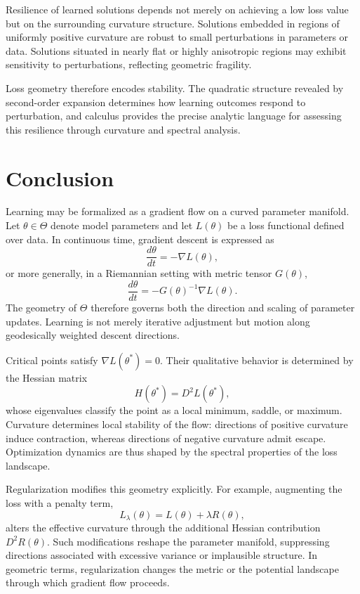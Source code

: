 \documentclass[12pt]{book}
\begin{document}
Resilience of learned solutions depends not merely on achieving a low loss value but on the surrounding curvature structure. Solutions embedded in regions of uniformly positive curvature are robust to small perturbations in parameters or data. Solutions situated in nearly flat or highly anisotropic regions may exhibit sensitivity to perturbations, reflecting geometric fragility.

Loss geometry therefore encodes stability. The quadratic structure revealed by second-order expansion determines how learning outcomes respond to perturbation, and calculus provides the precise analytic language for assessing this resilience through curvature and spectral analysis.

\section{Conclusion}

Learning may be formalized as a gradient flow on a curved parameter manifold. Let $\theta \in \Theta$ denote model parameters and let $L(\theta)$ be a loss functional defined over data. In continuous time, gradient descent is expressed as
\[
\frac{d\theta}{dt} = -\nabla L(\theta),
\]
or more generally, in a Riemannian setting with metric tensor $G(\theta)$,
\[
\frac{d\theta}{dt} = - G(\theta)^{-1} \nabla L(\theta).
\]
The geometry of $\Theta$ therefore governs both the direction and scaling of parameter updates. Learning is not merely iterative adjustment but motion along geodesically weighted descent directions.

Critical points satisfy $\nabla L(\theta^\ast)=0$. Their qualitative behavior is determined by the Hessian matrix
\[
H(\theta^\ast) = D^2 L(\theta^\ast),
\]
whose eigenvalues classify the point as a local minimum, saddle, or maximum. Curvature determines local stability of the flow: directions of positive curvature induce contraction, whereas directions of negative curvature admit escape. Optimization dynamics are thus shaped by the spectral properties of the loss landscape.

Regularization modifies this geometry explicitly. For example, augmenting the loss with a penalty term,
\[
L_\lambda(\theta) = L(\theta) + \lambda R(\theta),
\]
alters the effective curvature through the additional Hessian contribution $D^2 R(\theta)$. Such modifications reshape the parameter manifold, suppressing directions associated with excessive variance or implausible structure. In geometric terms, regularization changes the metric or the potential landscape through which gradient flow proceeds.
\end{document}
